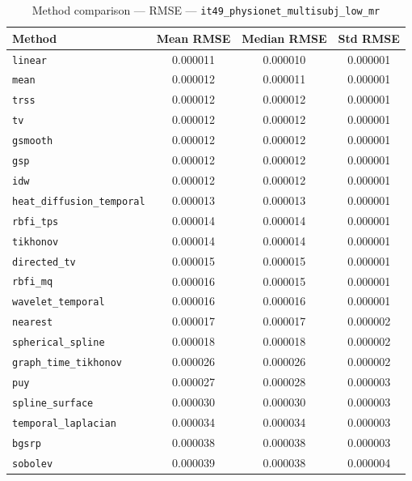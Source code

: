 \begin{table}[ht]
\centering
\caption{Method comparison — RMSE — \texttt{it49_physionet_multisubj_low_mr}}
\label{tab:rmse_it49_physionet_multisubj_low_mr}
\begin{tabular}{lccc}
\hline
Method & Mean RMSE & Median RMSE & Std RMSE \\
\hline
\texttt{linear} & 0.000011 & 0.000010 & 0.000001 \\
\texttt{mean} & 0.000012 & 0.000011 & 0.000001 \\
\texttt{trss} & 0.000012 & 0.000012 & 0.000001 \\
\texttt{tv} & 0.000012 & 0.000012 & 0.000001 \\
\texttt{gsmooth} & 0.000012 & 0.000012 & 0.000001 \\
\texttt{gsp} & 0.000012 & 0.000012 & 0.000001 \\
\texttt{idw} & 0.000012 & 0.000012 & 0.000001 \\
\texttt{heat_diffusion_temporal} & 0.000013 & 0.000013 & 0.000001 \\
\texttt{rbfi_tps} & 0.000014 & 0.000014 & 0.000001 \\
\texttt{tikhonov} & 0.000014 & 0.000014 & 0.000001 \\
\texttt{directed_tv} & 0.000015 & 0.000015 & 0.000001 \\
\texttt{rbfi_mq} & 0.000016 & 0.000015 & 0.000001 \\
\texttt{wavelet_temporal} & 0.000016 & 0.000016 & 0.000001 \\
\texttt{nearest} & 0.000017 & 0.000017 & 0.000002 \\
\texttt{spherical_spline} & 0.000018 & 0.000018 & 0.000002 \\
\texttt{graph_time_tikhonov} & 0.000026 & 0.000026 & 0.000002 \\
\texttt{puy} & 0.000027 & 0.000028 & 0.000003 \\
\texttt{spline_surface} & 0.000030 & 0.000030 & 0.000003 \\
\texttt{temporal_laplacian} & 0.000034 & 0.000034 & 0.000003 \\
\texttt{bgsrp} & 0.000038 & 0.000038 & 0.000003 \\
\texttt{sobolev} & 0.000039 & 0.000038 & 0.000004 \\
\hline
\end{tabular}
\end{table}
